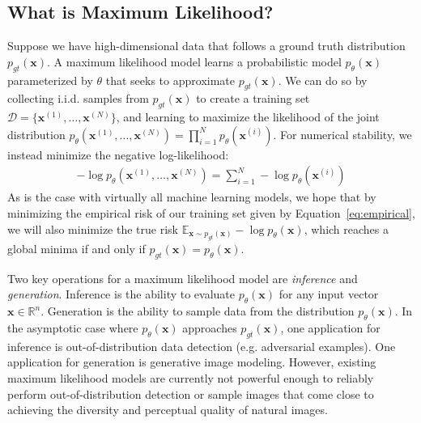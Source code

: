 \documentclass{article}
\begin{document}
\subsection{What is Maximum Likelihood?}
Suppose we have high-dimensional data that follows a ground truth distribution $p_{gt}(\mathbf{x})$.
A maximum likelihood model learns a probabilistic model $p_\theta(\mathbf{x})$ parameterized by $\theta$ that seeks to approximate $p_{gt}(\mathbf{x})$.
We can do so by collecting i.i.d. samples from $p_{gt}(\mathbf{x})$ to create a training set $\mathcal{D}=\{\mathbf{x}^{(1)}, \dots, \mathbf{x}^{(N)} \}$, and learning to maximize the likelihood of the joint distribution $p_\theta(\mathbf{x}^{(1)}, \dots, \mathbf{x}^{(N)}) = \prod_{i=1}^N p_\theta(\mathbf{x}^{(i)})$. For numerical stability, we instead minimize the negative log-likelihood:
\begin{align}
    -\log p_\theta(\mathbf{x}^{(1)}, \dots, \mathbf{x}^{(N)})
    = \sum_{i=1}^N -\log p_\theta(\mathbf{x}^{(i)}) \label{eq:empirical}
\end{align}
As is the case with virtually all machine learning models, we hope that by minimizing the empirical risk of our training set given by Equation~\ref{eq:empirical}, we will also minimize the true risk $\mathbb{E}_{\mathbf{x}\sim p_{gt}(\mathbf{x})} -\log p_\theta(\mathbf{x})$, which reaches a global minima if and only if $p_{gt}(\mathbf{x}) = p_\theta(\mathbf{x})$.

Two key operations for a maximum likelihood model are \emph{inference} and \emph{generation}. Inference is the ability to evaluate $p_\theta(\mathbf{x})$ for any input vector $\mathbf{x}\in \mathbb{R}^n$. Generation is the ability to sample data  from the distribution  $p_\theta(\mathbf{x})$.
In the asymptotic case
where $p_\theta(\mathbf{x})$ approaches $p_{gt}(\mathbf{x})$, one application for inference is out-of-distribution data detection (e.g. adversarial examples).
One application for generation is generative image modeling.
However, existing maximum likelihood models are currently not powerful enough to reliably perform out-of-distribution detection or sample images that come close to achieving the diversity and perceptual quality of natural images.
\end{document}
